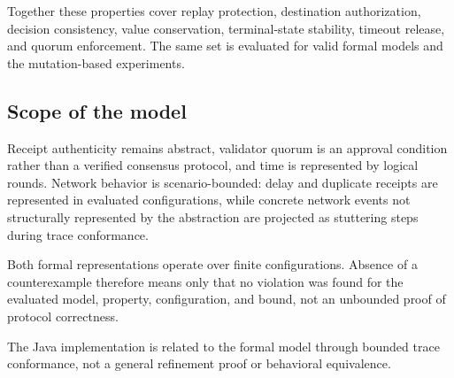 Together these properties cover replay protection, destination authorization,
decision consistency, value conservation, terminal-state stability, timeout
release, and quorum enforcement. The same set is evaluated for valid formal
models and the mutation-based experiments.

\subsection{Scope of the model}
\label{subsec:model-scope}

Receipt authenticity remains abstract, validator quorum is an approval
condition rather than a verified consensus protocol, and time is represented by
logical rounds. Network behavior is scenario-bounded: delay and duplicate
receipts are represented in evaluated configurations, while concrete network
events not structurally represented by the abstraction are projected as
stuttering steps during trace conformance.

Both formal representations operate over finite configurations. Absence of a
counterexample therefore means only that no violation was found for the
evaluated model, property, configuration, and bound, not an unbounded proof of
protocol correctness.

The Java implementation is related to the formal model through bounded trace
conformance, not a general refinement proof or behavioral equivalence.
